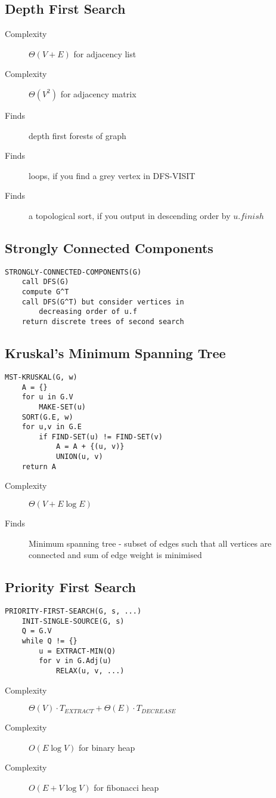 \documentclass[landscape]{cheat}
\begin{document}
\begin{multicols*}{3}
\subsection{Depth First Search}
\begin{description}
    \item[Complexity] $\Theta(V+E)$ for adjacency list
    \item[Complexity] $\Theta(V^2)$ for adjacency matrix
    \item[Finds] depth first forests of graph
    \item[Finds] loops, if you find a grey vertex in DFS-VISIT
    \item[Finds] a topological sort, if you output in descending order by $u.finish$
\end{description}

\subsection{Strongly Connected Components}
\begin{lstlisting}
STRONGLY-CONNECTED-COMPONENTS(G)
    call DFS(G)
    compute G^T
    call DFS(G^T) but consider vertices in
        decreasing order of u.f
    return discrete trees of second search
\end{lstlisting}

\subsection{Kruskal's Minimum Spanning Tree}
\begin{lstlisting}
MST-KRUSKAL(G, w)
    A = {}
    for u in G.V
        MAKE-SET(u)
    SORT(G.E, w)
    for u,v in G.E
        if FIND-SET(u) != FIND-SET(v)
            A = A + {(u, v)}
            UNION(u, v)
    return A
\end{lstlisting}
\begin{description}
    \item[Complexity] $\Theta(V+E\log{E})$
    \item[Finds] Minimum spanning tree - subset of edges such that all vertices are connected and sum of edge weight is minimised
\end{description}

\subsection{Priority First Search}
\begin{lstlisting}
PRIORITY-FIRST-SEARCH(G, s, ...)
    INIT-SINGLE-SOURCE(G, s)
    Q = G.V
    while Q != {}
        u = EXTRACT-MIN(Q)
        for v in G.Adj(u)
            RELAX(u, v, ...)
\end{lstlisting}
\begin{description}
    \item[Complexity] $\Theta(V)\cdot T_{EXTRACT} + \Theta(E)\cdot T_{DECREASE}$
    \item[Complexity] $O(E\log{V})$ for binary heap
    \item[Complexity] $O(E+V\log{V})$ for fibonacci heap
\end{description}


\end{multicols*}
\end{document}
